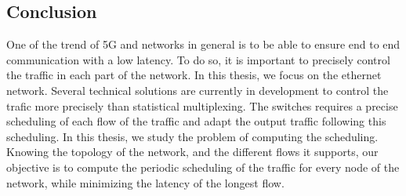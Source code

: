 \subsection{Conclusion}
One of the trend of 5G and networks in general is to be able to ensure end to end communication with a low latency. To do so, it is important to precisely control the traffic in each part of the network. In this thesis, we focus on the ethernet network. Several technical solutions are currently in development to control the trafic more precisely than statistical multiplexing. The switches requires a precise scheduling of each flow of the traffic and adapt the output traffic following this scheduling. 
In this thesis, we study the problem of computing the scheduling. Knowing the topology of the network, and the different flows it supports, our objective is to compute the periodic scheduling of the traffic for every node of the network, while minimizing the latency of the longest flow. 



